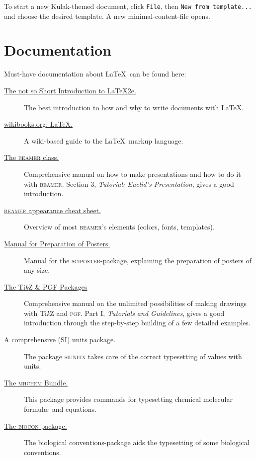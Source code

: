 \documentclass[a4paper,kulak]{kulakarticle} %
\begin{document}
To start a new Kulak-themed document, click \texttt{File}, then \texttt{New from template...} and choose the desired template. A new minimal-content-file opens.

\section{Documentation}
Must-have documentation about \LaTeX\ can be found here:
\begin{description}
\item[\href{http://mirrors.ctan.org/info/lshort/english/lshort.pdf}{The not so Short Introduction to \LaTeX2e.}]
  The best introduction to how and why to write documents with \LaTeX.
\item[\href{http://en.wikibooks.org/wiki/LaTeX}{wikibooks.org: \LaTeX.}]
  A wiki-based guide to the \LaTeX\ markup language.
\item[\href{http://mirrors.ctan.org/macros/latex/contrib/beamer/doc/beameruserguide.pdf}{The \textsc{beamer} class.}]
  Comprehensive manual on how to make presentations and how to do it with \textsc{beamer}. Section 3, \emph{Tutorial: Euclid’s Presentation}, gives a good introduction.
\item[\href{http://science.thilucmic.fr/spip.php?article35}{\textsc{beamer} appearance cheat sheet.}]
  Overview of most \textsc{beamer}’s elements (colors, fonts, templates).
\item[\href{http://mirrors.ctan.org/macros/latex/contrib/sciposter/scipostermanual.pdf}{Manual for Preparation of Posters.}]
  Manual for the \textsc{sciposter}-package, explaining the preparation of posters of any size.
\item[\href{http://mirrors.ctan.org/graphics/pgf/base/doc/generic/pgf/pgfmanual.pdf}{The Ti\emph{k}Z \& \textsc{PGF} Packages}] Comprehensive manual on the unlimited possibilities of making drawings with Ti\emph{k}Z and \textsc{pgf}. Part I, \emph{Tutorials and Guidelines}, gives a good introduction through the step-by-step building of a few detailed examples.
\item[\href{http://mirrors.ctan.org/macros/latex/contrib/siunitx/siunitx.pdf}{A comprehensive (SI) units package.}]
The package \textsc{siunitx} takes care of the correct typesetting of values with units.
\item[\href{http://mirrors.ctan.org/macros/latex/contrib/mhchem/mhchem.pdf}{The \textsc{mhchem} Bundle.}] This package provides commands for typesetting chemical molecular formul\ae\ and equations.
\item[\href{http://mirrors.ctan.org/macros/latex/contrib/biocon/manual.pdf}{The \textsc{biocon} package.}] The biological conventions-package aids the typesetting of some biological conventions.
\end{description}
\end{document}
